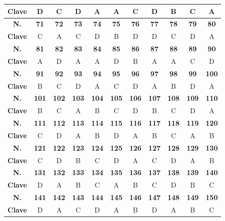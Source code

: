 \begin{center}
\begin{tabular}{|c|c|c|c|c|c|c|c|c|c|c|}
\hline
\textbf{Clave} & D & C & D & A & A & C & D & B & C & A \\
\hline
\textbf{N.} & \textbf{71} & \textbf{72} & \textbf{73} & \textbf{74} & \textbf{75} & \textbf{76} & \textbf{77} & \textbf{78} & \textbf{79} & \textbf{80} \\
\hline
\textbf{Clave} & C & A & C & D & B & D & D & C & D & A \\
\hline
\textbf{N.} & \textbf{81} & \textbf{82} & \textbf{83} & \textbf{84} & \textbf{85} & \textbf{86} & \textbf{87} & \textbf{88} & \textbf{89} & \textbf{90} \\
\hline
\textbf{Clave} & A & D & A & A & D & B & A & A & C & D \\
\hline
\textbf{N.} & \textbf{91} & \textbf{92} & \textbf{93} & \textbf{94} & \textbf{95} & \textbf{96} & \textbf{97} & \textbf{98} & \textbf{99} & \textbf{100} \\
\hline
\textbf{Clave} & B & C & D & A & C & D & A & B & D & A \\
\hline
\textbf{N.} & \textbf{101} & \textbf{102} & \textbf{103} & \textbf{104} & \textbf{105} & \textbf{106} & \textbf{107} & \textbf{108} & \textbf{109} & \textbf{110} \\
\hline
\textbf{Clave} & B & C & A & B & C & D & B & C & D & A \\
\hline
\textbf{N.} & \textbf{111} & \textbf{112} & \textbf{113} & \textbf{114} & \textbf{115} & \textbf{116} & \textbf{117} & \textbf{118} & \textbf{119} & \textbf{120} \\
\hline
\textbf{Clave} & C & D & A & B & D & A & B & C & A & B \\
\hline
\textbf{N.} & \textbf{121} & \textbf{122} & \textbf{123} & \textbf{124} & \textbf{125} & \textbf{126} & \textbf{127} & \textbf{128} & \textbf{129} & \textbf{130} \\
\hline
\textbf{Clave} & C & D & B & C & D & A & C & D & A & B \\
\hline
\textbf{N.} & \textbf{131} & \textbf{132} & \textbf{133} & \textbf{134} & \textbf{135} & \textbf{136} & \textbf{137} & \textbf{138} & \textbf{139} & \textbf{140} \\
\hline
\textbf{Clave} & D & A & B & C & A & B & C & D & B & C \\
\hline
\textbf{N.} & \textbf{141} & \textbf{142} & \textbf{143} & \textbf{144} & \textbf{145} & \textbf{146} & \textbf{147} & \textbf{148} & \textbf{149} & \textbf{150} \\
\hline
\textbf{Clave} & D & A & C & D & A & B & D & A & B & C \\

\end{tabular}
\end{center}
